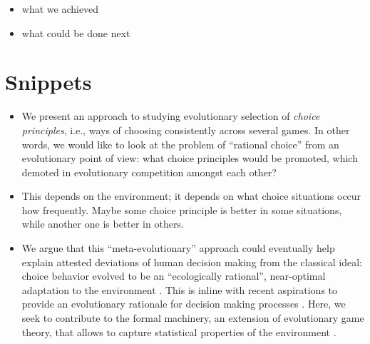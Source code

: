 \documentclass[fleqn,reqno,11pt]{article}
\begin{document}
\begin{itemize}
\item what we achieved
\item what could be done next
\end{itemize}




\printbibliography[heading=bibintoc]


\newpage

\section*{Snippets}

\begin{itemize}
\item We present an approach to studying evolutionary selection of \emph{choice principles},
  i.e., ways of choosing consistently across several games. In other words, we would like to
  look at the problem of ``rational choice'' from an evolutionary point of view: what choice
  principles would be promoted, which demoted in evolutionary competition amongst each other?

\item This depends on the environment; it depends on what choice situations occur how
  frequently. Maybe some choice principle is better in some situations, while another one is
  better in others. 


\item We argue that this ``meta-evolutionary'' approach could eventually help explain attested
  deviations of human decision making from the classical ideal: choice behavior evolved to be
  an ``ecologically rational'', near-optimal adaptation to the environment
  \citep{Anderson1990:The-Adaptive-Ch,Anderson1991:Is-human-cognit,GigerenzerGoldstein1996:Reasoning-the-F,ChaterOaksford2000:The-Rational-An}. This
  is inline with recent aspirations to provide an evolutionary rationale for decision making
  processes
  \citep[e.g.][]{HammersteinStevens2012:Six-Reasons-for,FawcettHamblin2013:Exposing-the-be}. Here,
  we seek to contribute to the formal machinery, an extension of evolutionary game theory, that
  allows to capture statistical properties of the environment
  \citep[cf.][]{McNamara2013:Towards-a-Riche}.
\end{itemize}
\end{document}
